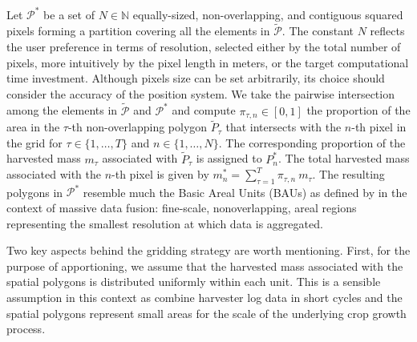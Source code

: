  Let $\mathcal{P}^{*}$ be
a set of $N \in \mathbb{N}$ equally-sized, non-overlapping, and
contiguous squared pixels forming a partition covering all the
elements in $\tilde{\mathcal{P}}$. The constant $N$ reflects the user
preference in terms of resolution, selected either by the total number
of pixels, more intuitively by the pixel length in meters, or the
target computational time investment. Although pixels size can be set
arbitrarily, its choice should consider the accuracy of the position
system. We take the pairwise intersection among the elements in
$\tilde{\mathcal{P}}$ and $\mathcal{P}^{*}$ and compute
$\pi_{\tau, n} \in [0, 1]$ the proportion of the area in the $\tau$-th
non-overlapping polygon $\tilde{P}_{\tau}$ that intersects with the
$n$-th pixel in the grid for $\tau \in \{1, \dots, T\}$ and
$n \in \{1, \dots, N\}$. The corresponding proportion of the harvested
mass $m_{\tau}$ associated with $\tilde{P}_{\tau}$ is assigned to
$P^{*}_n$. The total harvested mass associated with the $n$-th pixel
is given by $m^{*}_n = \sum_{\tau = 1}^{T} \pi_{\tau, n} \
m_{\tau}$. The resulting polygons in $\mathcal{P}^{*}$ resemble much
the Basic Areal Units (BAUs) as defined by \cite{Nguyen2012} in the
context of massive data fusion: fine-scale, nonoverlapping, areal
regions representing the smallest resolution at which data is
aggregated.

 Two key aspects behind the
gridding strategy are worth mentioning. First, for the purpose of
apportioning, we assume that the harvested mass associated with the
spatial polygons is distributed uniformly within each unit. This is a
sensible assumption in this context as combine harvester log data in
short cycles and the spatial polygons represent small areas for the
scale of the underlying crop growth process.

